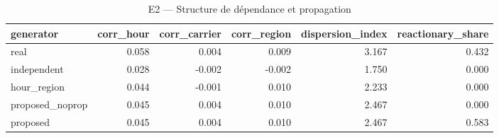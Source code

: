 \begin{table}
\caption{E2 — Structure de dépendance et propagation}
\label{tab:T2}
\begin{tabular}{lrrrrr}
\toprule
generator & corr\_hour & corr\_carrier & corr\_region & dispersion\_index & reactionary\_share \\
\midrule
real & 0.058 & 0.004 & 0.009 & 3.167 & 0.432 \\
independent & 0.028 & -0.002 & -0.002 & 1.750 & 0.000 \\
hour\_region & 0.044 & -0.001 & 0.010 & 2.233 & 0.000 \\
proposed\_noprop & 0.045 & 0.004 & 0.010 & 2.467 & 0.000 \\
proposed & 0.045 & 0.004 & 0.010 & 2.467 & 0.583 \\
\bottomrule
\end{tabular}
\end{table}
